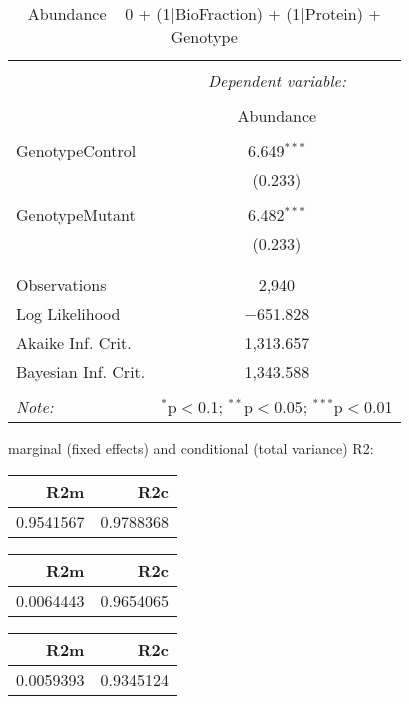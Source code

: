 \documentclass[11pt]{report}
\begin{document}
\begin{table}[!htbp] \centering 
  \caption{Abundance ~ 0 + (1|BioFraction) + (1|Protein) + Genotype} 
  \label{} 
\begin{tabular}{@{\extracolsep{5pt}}lc} 
\\[-1.8ex]\hline 
\hline \\[-1.8ex] 
 & \multicolumn{1}{c}{\textit{Dependent variable:}} \\ 
\cline{2-2} 
\\[-1.8ex] & Abundance \\ 
\hline \\[-1.8ex] 
 GenotypeControl & 6.649$^{***}$ \\ 
  & (0.233) \\ 
  & \\ 
 GenotypeMutant & 6.482$^{***}$ \\ 
  & (0.233) \\ 
  & \\ 
\hline \\[-1.8ex] 
Observations & 2,940 \\ 
Log Likelihood & $-$651.828 \\ 
Akaike Inf. Crit. & 1,313.657 \\ 
Bayesian Inf. Crit. & 1,343.588 \\ 
\hline 
\hline \\[-1.8ex] 
\textit{Note:}  & \multicolumn{1}{r}{$^{*}$p$<$0.1; $^{**}$p$<$0.05; $^{***}$p$<$0.01} \\ 
\end{tabular} 
\end{table} 
marginal (fixed effects) and conditional (total variance) R2:

\begin{tabular}{r|r}
\hline
R2m & R2c\\
\hline
0.9541567 & 0.9788368\\
\hline
\end{tabular}

\begin{tabular}{r|r}
\hline
R2m & R2c\\
\hline
0.0064443 & 0.9654065\\
\hline
\end{tabular}

\begin{tabular}{r|r}
\hline
R2m & R2c\\
\hline
0.0059393 & 0.9345124\\
\hline
\end{tabular}
\end{document}
